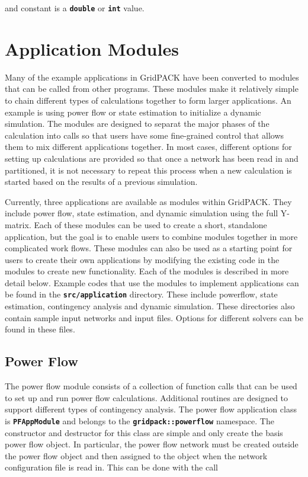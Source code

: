 \documentclass[12pt]{report} %
\begin{document}
and constant is a \texttt{\textbf{double}} or \texttt{\textbf{int}} value.

\chapter{Application Modules}

Many of the example applications in GridPACK have been converted to modules that can be called from other programs. These modules make it relatively simple to chain different types of calculations together to form larger applications. An example is using power flow or state estimation to initialize a dynamic simulation. The modules are designed to separat the major phases of the calculation into calls so that users have some fine-grained control that allows them to mix different applications together. In most cases, different options for setting up calculations are provided so that once a network has been read in and partitioned, it is not necessary to repeat this process when a new calculation is started based on the results of a previous simulation.

Currently, three applications are available as modules within GridPACK. They include power flow, state estimation, and dynamic simulation using the full Y-matrix. Each of these modules can be used to create a short, standalone application, but the goal is to enable users to combine modules together in more complicated work flows. These modules can also be used as a starting point for users to create their own applications by modifying the existing code in the modules to create new functionality. Each of the modules is described in more detail below. Example codes that use the modules to implement applications can be found in the \texttt{\textbf{src/application}} directory. These include powerflow, state estimation, contingency analysis and dynamic simulation. These directories also contain sample input networks and input files. Options for different solvers can be found in these files.

\section{Power Flow}

The power flow module consists of a collection of function calls that can be used to set up and run power flow calculations. Additional routines are designed to support different types of contingency analysis. The power flow application class is \texttt{\textbf{PFAppModule}} and belongs to the \texttt{\textbf{gridpack::powerflow}} namespace. The constructor and destructor for this class are simple and only create the basis power flow object. In particular, the power flow network must be created outside the power flow object and then assigned to the object when the network configuration file is read in. This can be done with the call
\end{document}
